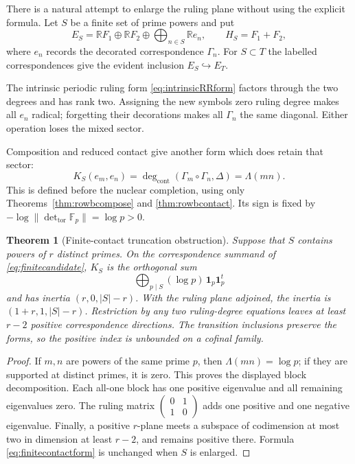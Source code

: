 \documentclass[11pt]{amsart}
\newtheorem{theorem}{Theorem}[section]
\theoremstyle{definition}
\theoremstyle{remark}
\begin{document}
There is a natural attempt to enlarge the ruling plane without using the
explicit formula.  Let $S$ be a finite set of prime powers and put
\begin{equation}\label{eq:finitecandidate}
 E_S=\mathbb RF_1\oplus\mathbb RF_2
     \oplus\bigoplus_{n\in S}\mathbb Re_n,
 \qquad H_S=F_1+F_2,
\end{equation}
where $e_n$ records the decorated correspondence $\Gamma_n$.  For
$S\subset T$ the labelled correspondences give the evident inclusion
$E_S\hookrightarrow E_T$.

The intrinsic periodic ruling form \eqref{eq:intrinsicRRform} factors through the two degrees and has
rank two.  Assigning the new symbols zero ruling degree makes all $e_n$
radical; forgetting their decorations makes all $\Gamma_n$ the same
diagonal.  Either operation loses the mixed sector.

Composition and reduced contact give another form which does retain that
sector:
\begin{equation}\label{eq:finitecontactform}
 K_S(e_m,e_n)
 =\deg_{\mathrm{cont}}(\Gamma_m\circ\Gamma_n,\Delta)
 =\Lambda(mn).
\end{equation}
This is defined before the nuclear completion, using only
Theorems~\ref{thm:rowbcompose} and \ref{thm:rowbcontact}.  Its sign is fixed
by $-\log\|\det_{\mathrm{tor}}\mathbb F_p\|=\log p>0$.

\begin{theorem}[Finite-contact truncation obstruction]
\label{thm:finitecontactobstruction}
Suppose that $S$ contains powers of $r$ distinct primes.  On the
correspondence summand of \eqref{eq:finitecandidate}, $K_S$ is the orthogonal
sum
\[
 \bigoplus_{p\mid S}(\log p)\,\mathbf1_p\mathbf1_p^t
\]
and has inertia $(r,0,|S|-r)$.  With the ruling plane adjoined, the inertia is
$(1+r,1,|S|-r)$.  Restriction by any two ruling-degree equations leaves at
least $r-2$ positive correspondence directions.  The transition inclusions
preserve the forms, so the positive index is unbounded on a cofinal family.
\end{theorem}

\begin{proof}
If $m,n$ are powers of the same prime $p$, then
$\Lambda(mn)=\log p$; if they are supported at distinct primes, it is zero.
This proves the displayed block decomposition.  Each all-one block has one
positive eigenvalue and all remaining eigenvalues zero.  The ruling matrix
$\left(\begin{smallmatrix}0&1\\1&0\end{smallmatrix}\right)$ adds one positive
and one negative eigenvalue.  Finally, a positive $r$-plane meets a subspace
of codimension at most two in dimension at least $r-2$, and remains positive
there.  Formula \eqref{eq:finitecontactform} is unchanged when $S$ is enlarged.
\end{proof}
\end{document}
